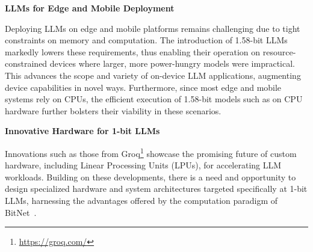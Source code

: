 \textbf{LLMs for Edge and Mobile Deployment}

Deploying LLMs on edge and mobile platforms remains challenging due to tight constraints on memory and computation. The introduction of 1.58-bit LLMs markedly lowers these requirements, thus enabling their operation on resource-constrained devices where larger, more power-hungry models were impractical. This advances the scope and variety of on-device LLM applications, augmenting device capabilities in novel ways. Furthermore, since most edge and mobile systems rely on CPUs, the efficient execution of 1.58-bit models such as  on CPU hardware further bolsters their viability in these scenarios.

\textbf{Innovative Hardware for 1-bit LLMs}

Innovations such as those from Groq\footnote{\url{https://groq.com/}} showcase the promising future of custom hardware, including Linear Processing Units (LPUs), for accelerating LLM workloads. Building on these developments, there is a need and opportunity to design specialized hardware and system architectures targeted specifically at 1-bit LLMs, harnessing the advantages offered by the computation paradigm of BitNet~\cite{bitnet}.